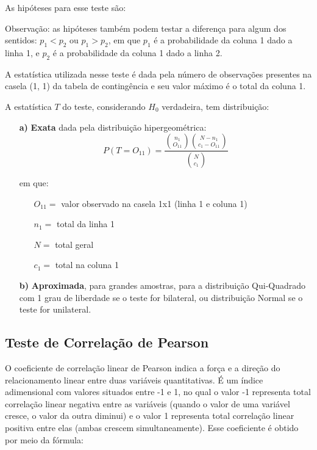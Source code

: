 \documentclass[
]{estat/estat}
\begin{document}
As hipóteses para esse teste são:


Observação: as hipóteses também podem testar a diferença para algum dos
sentidos: \(p_{1} < p_{2}\) ou \(p_{1} > p_{2}\), em que \(p_{1}\) é a
probabilidade da coluna 1 dado a linha 1, e \(p_{2}\) é a probabilidade
da coluna 1 dado a linha 2.

A estatística utilizada nesse teste é dada pela número de observações
presentes na casela (1, 1) da tabela de contingência e seu valor máximo
é o total da coluna 1.

A estatística \(T\) do teste, considerando \(H_{0}\) verdadeira, tem
distribuição:

\begin{itemize}
    \item [\bf a)] \textbf{Exata} dada pela distribuição hipergeométrica:
    $$ P(T = O_{11}) = \frac{\binom{n_{1}}{O_{11}} \binom{N - n_{1}}{c_{1} - O_{11}}}{\binom{N}{c_{1}}} $$
    
    em que:
    \begin{itemize}
        \item [] $O_{11} =$ valor observado na casela 1x1 (linha 1 e coluna 1)
        \item [] $n_{1} =$ total da linha 1
        \item [] $N =$ total geral
        \item [] $c_{1} =$ total na coluna 1
    \end{itemize}
    
    \item [\bf b)] \textbf{Aproximada}, para grandes amostras, para a distribuição Qui-Quadrado com 1 grau de liberdade se o teste for bilateral, ou distribuição Normal se o teste for unilateral.
\end{itemize}

\subsection{Teste de Correlação de
Pearson}\label{teste-de-correlauxe7uxe3o-de-pearson}

O coeficiente de correlação linear de Pearson indica a força e a direção
do relacionamento linear entre duas variáveis quantitativas. É um índice
adimensional com valores situados entre -1 e 1, no qual o valor -1
representa total correlação linear negativa entre as variáveis (quando o
valor de uma variável cresce, o valor da outra diminui) e o valor 1
representa total correlação linear positiva entre elas (ambas crescem
simultaneamente). Esse coeficiente é obtido por meio da fórmula:
\end{document}
